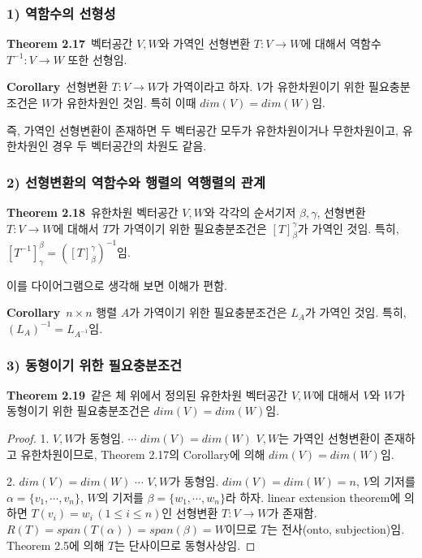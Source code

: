 \subsubsection*{1) 역함수의 선형성}
\textbf{Theorem 2.17}\, 벡터공간 $V,W$와 가역인 선형변환 $T:V \rightarrow W$에 대해서 역함수 $T^{-1}:V \rightarrow W$ 또한 선형임.

\textbf{Corollary}\, 선형변환 $T:V \rightarrow W$가 가역이라고 하자. $V$가 유한차원이기 위한 필요충분조건은 $W$가 유한차원인 것임. 특히 이때 $dim(V)=dim(W)$임.

즉, 가역인 선형변환이 존재하면 두 벡터공간 모두가 유한차원이거나 무한차원이고, 유한차원인 경우 두 벡터공간의 차원도 같음.

\subsubsection*{2) 선형변환의 역함수와 행렬의 역행렬의 관계}
\textbf{Theorem 2.18}\, 유한차원 벡터공간 $V,W$와 각각의 순서기저 $\beta,\gamma$, 선형변환 $T:V \rightarrow W$에 대해서 $T$가 가역이기 위한 필요충분조건은 $[T]^{\gamma}_{\beta}$가 가역인 것임. 특히, $[T^{-1}]_{\gamma}^{\beta}=([T]_{\beta}^{\gamma})^{-1}$임.

이를 다이어그램으로 생각해 보면 이해가 편함.

\textbf{Corollary}\, $n \times n$ 행렬 $A$가 가역이기 위한 필요충분조건은 $L_A$가 가역인 것임. 특히, $(L_A)^{-1}=L_{A^{-1}}$임.

\subsubsection*{3) 동형이기 위한 필요충분조건}
\textbf{Theorem 2.19}\, 같은 체 위에서 정의된 유한차원 벡터공간 $V,W$에 대해서 $V$와 $W$가 동형이기 위한 필요충분조건은 $dim(V)=dim(W)$임.

\begin{proof}
1. $V,W$가 동형임. $\cdots$ $dim(V)=dim(W)$
$V,W$는 가역인 선형변환이 존재하고 유한차원이므로, Theorem 2.17의 Corollary에 의해 $dim(V)=dim(W)$임.

2. $dim(V)=dim(W)$ $\cdots$ $V,W$가 동형임.
$dim(V)=dim(W)=n$, $V$의 기저를 $\alpha=\{v_1, \cdots ,v_n\}$, $W$의 기저를 $\beta=\{w_1, \cdots ,w_n\}$라 하자. linear extension theorem에 의하면 $T(v_i)=w_i\,(1 \leq i \leq n)$인 선형변환 $T:V \rightarrow W$가 존재함. $R(T)=span(T(\alpha))=span(\beta)=W$이므로 $T$는 전사(onto, subjection)임. Theorem 2.5에 의해 $T$는 단사이므로 동형사상임.
\end{proof}


